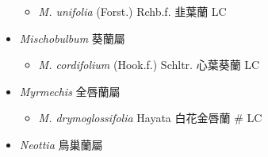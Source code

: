 \begin{itemize}
  \begin{itemize}
        \item[] \textit{M. unifolia} (Forst.) Rchb.f.  韭葉蘭   LC
  \end{itemize}
 \item[] \textit{Mischobulbum} 葵蘭屬
                                
  \begin{itemize}
        \item[] \textit{M. cordifolium} (Hook.f.) Schltr.  心葉葵蘭   LC
  \end{itemize}
 \item[] \textit{Myrmechis} 全唇蘭屬
                                
  \begin{itemize}
        \item[] \textit{M. drymoglossifolia} Hayata  白花金唇蘭  \# LC
  \end{itemize}
 \item[] \textit{Neottia} 鳥巢蘭屬
                                

\end{itemize}
